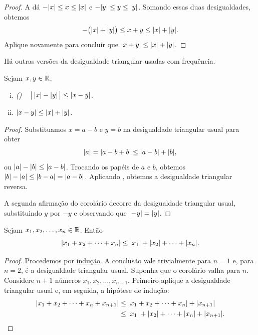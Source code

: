 \begin{proof}
A  dá
$- \lvert {x} \rvert \leq x \leq \lvert {x} \rvert$ e
$- \lvert {y} \rvert \leq y \leq \lvert {y} \rvert$. Somando essas duas desigualdades, obtemos
\begin{equation*}
- \bigl(\lvert {x} \rvert+\lvert {y} \rvert\bigr) \leq x+y \leq \lvert {x} \rvert+ \lvert {y} \rvert .
\end{equation*}
Aplique  novamente para concluir que
$\lvert {x+y} \rvert \leq \lvert {x} \rvert+\lvert {y} \rvert$.
\end{proof}

Há outras versões da desigualdade triangular usadas com frequência.

\begin{cor}
Sejam $x,y \in {\mathbb{R}}$.
\begin{enumerate}[(i)]
\item \emph{()}
~
$\bigl\lvert { \, \lvert {x} \rvert-\lvert {y} \rvert \, } \bigr\rvert \leq \lvert {x-y} \rvert$.
\item $\lvert {x-y} \rvert \leq \lvert {x} \rvert+\lvert {y} \rvert$.
\end{enumerate}
\end{cor}

\begin{proof}
Substituamos $x=a-b$ e $y=b$ na desigualdade triangular usual para obter
\begin{equation*}
\lvert {a} \rvert = \lvert {a-b+b} \rvert \leq \lvert {a-b} \rvert + \lvert {b} \rvert ,
\end{equation*}
ou $\lvert {a} \rvert-\lvert {b} \rvert \leq \lvert {a-b} \rvert$. Trocando os papéis de $a$ e $b$,
obtemos
$\lvert {b} \rvert-\lvert {a} \rvert \leq \lvert {b-a} \rvert = \lvert {a-b} \rvert$. Aplicando
, obtemos a desigualdade triangular reversa.

A segunda afirmação do corolário decorre da desigualdade triangular
usual, substituindo $y$ por $-y$ e observando que $\lvert {-y} \rvert =
\lvert {y} \rvert$.
\end{proof}

\begin{cor}
Sejam $x_1, x_2, \ldots, x_n \in {\mathbb{R}}$. Então
\begin{equation*}
\lvert {x_1 + x_2 + \cdots + x_n} \rvert \leq
\lvert {x_1} \rvert + \lvert {x_2} \rvert + \cdots + \lvert {x_n} \rvert .
\end{equation*}
\end{cor}

\begin{proof}
Procedemos por \hyperref[induction:thm]{indução}.
A conclusão vale trivialmente para $n=1$ e,
para $n=2$, é a desigualdade triangular usual. Suponha que o corolário
valha para $n$. Considere $n+1$ números $x_1,x_2,\ldots,x_{n+1}$.
Primeiro aplique a desigualdade triangular usual e, em seguida, a hipótese
de indução:
\begin{equation*}
\begin{split}
\lvert {x_1 + x_2 + \cdots + x_n + x_{n+1}} \rvert & \leq
\lvert {x_1 + x_2 + \cdots + x_n} \rvert + \lvert {x_{n+1}} \rvert \\
& \leq
\lvert {x_1} \rvert + \lvert {x_2} \rvert + \cdots + \lvert {x_n} \rvert + \lvert {x_{n+1}} \rvert .  \qedhere
\end{split}
\end{equation*}
\end{proof}

